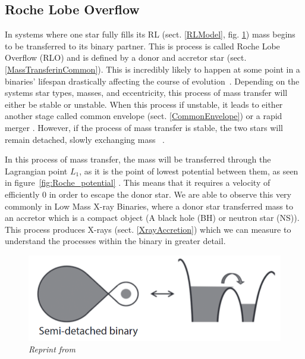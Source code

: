 \documentclass[12pt, letterpaper]{article}
\begin{document}
        \subsection{\centering Roche Lobe Overflow}\label{RLO} %
        In systems where one star fully fills its RL (sect. \ref{RLModel}, fig. \ref{SemidetachedRL}) mass begins to be transferred to its binary partner. This is process is called Roche Lobe Overflow (RLO) and is defined by a donor and accretor star (sect. \ref{MassTransferinCommon}). This is incredibly likely to happen at some point in a binaries' lifespan drastically affecting the course of evolution~\cite{TaurisvandenHeuvel+2023}\cite{Chen_2024}\cite{Chen_2024}. Depending on the systems star types, masses, and eccentricity, this process of mass transfer will either be stable or unstable. When this process if unstable, it leads to either another stage called common envelope (sect. \ref{CommonEnvelope}) or a rapid merger \cite{TaurisvandenHeuvel+2023}. However, if the process of mass transfer is stable, the two stars will remain detached, slowly exchanging mass~\cite{Chen_2024} \cite{TaurisvandenHeuvel+2023}.

        In this process of mass transfer, the mass will be transferred through the Lagrangian point $L_1$, as it is the point of lowest potential between them, as seen in figure~\ref{fig:Roche_potential} \cite{TaurisvandenHeuvel+2023}. This means that it requires a velocity of efficiently 0 in order to escape the donor star. We are able to observe this very commonly in Low Mass X-ray Binaries, where a donor star transferred mass to an accretor which is a compact object (A black hole (BH) or neutron star (NS)). This process produces X-rays (sect. \ref{XrayAccretion}) which we can measure to understand the processes within the binary in greater detail.
        
       \begin{figure}[h] 
            \centering
            \includegraphics[scale = .4]{Figs/Semi-detached binary.png}
            \caption{\textit{Reprint from~\cite{TaurisvandenHeuvel+2023}}}
            \label{SemidetachedRL}
        \end{figure}
        
\end{document}
